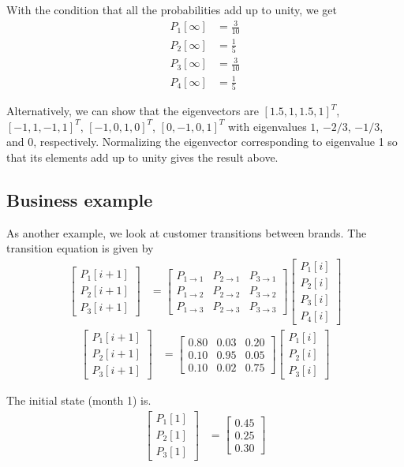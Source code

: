 \documentclass[twocolumn]{myarticle}
\newcommand{\mat}[1]{\begin{bmatrix}#1\end{bmatrix}}
\begin{document}
With the condition that all the probabilities add up to unity, we get
\begin{align}
    P_1[\infty] &= \frac{3}{10}
    \\
    P_2[\infty] &= \frac{1}{5}
    \\
    P_3[\infty] &= \frac{3}{10}
    \\
    P_4[\infty] &= \frac{1}{5}
\end{align}

Alternatively, we can show that the eigenvectors are $ [1.5, 1, 1.5, 1]^T $, $ [-1, 1, -1, 1]^T $, $ [-1, 0, 1, 0]^T $, $ [0, -1, 0, 1]^T $ with eigenvalues $ 1 $, $ -2/3 $, $ -1/3 $, and $ 0 $, respectively.
Normalizing the eigenvector corresponding to eigenvalue 1 so that its elements add up to unity gives the result above.

\subsection{Business example}
\label{subsec:business_example}

As another example, we look at customer transitions between brands.
The transition equation is given by
\begin{align}
    \mat{P_1[i+1] \\ P_2[i+1] \\ P_3[i+1]} &= 
    \mat{P_{1 \to 1} & P_{2 \to 1} & P_{3 \to 1} \\
         P_{1 \to 2} & P_{2 \to 2} & P_{3 \to 2} \\
         P_{1 \to 3} & P_{2 \to 3} & P_{3 \to 3} }
    \mat{P_1[i] \\ P_2[i] \\ P_3[i] \\ P_4[i]} 
\end{align}
\begin{align}
    \mat{P_1[i+1] \\ P_2[i+1] \\ P_3[i+1]} &= 
    \mat{0.80 & 0.03 & 0.20 \\
         0.10 & 0.95 & 0.05 \\
         0.10 & 0.02 & 0.75 }
    \mat{P_1[i] \\ P_2[i] \\ P_3[i]} 
\end{align}

The initial state (month 1) is.
\begin{align}
    \mat{P_1[1] \\ P_2[1] \\ P_3[1]} &= \mat{0.45 \\ 0.25 \\ 0.30}
\end{align}
\end{document}
